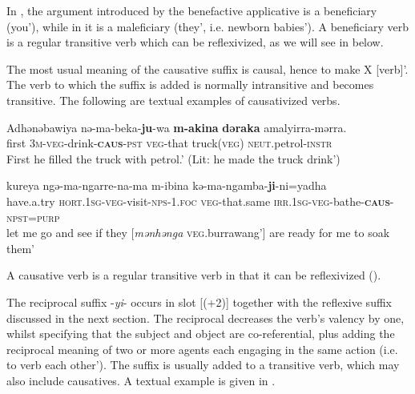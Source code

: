 \documentclass[output=paper]{langscibook}
\begin{document}
In , the argument introduced by the benefactive applicative is a beneficiary (you’), while in  it is a maleficiary (they’, i.e. newborn babies’). A beneficiary verb is a regular transitive verb which can be reflexivized, as we will see in  below.



\label{sec:vanegmond:2.3.3.2}


The most usual meaning of the causative suffix is causal, hence to make X [verb]’. The verb to which the suffix is added is normally intransitive and becomes transitive. The following are textual examples of causativized verbs.



\ea%
 \label{ex:vanegmond:14}

 \ea
 \label{ex:vanegmond:14a}
\gll Adhənəbawiya nə-ma-beka-\textbf{{ju}}{-wa} \textbf{m-akina} \textbf{dəraka} {amalyirra-mərra}.\\
first \textsc{3m}-\textsc{veg}-drink-\textbf{\textsc{caus}}-\textsc{pst} \textsc{veg}-that truck(\textsc{veg}) \textsc{neut}.petrol-\textsc{instr}\\
\glt First he filled the truck with petrol.’ (Lit: he made the truck drink’)

 \ex
 \label{ex:vanegmond:14b}
\gll kureya ngə-ma-ngarre-na-ma m-ibina kə-ma-ngamba-\textbf{ji}{-ni=yadha} \\
have.a.try \textsc{hort.1sg-veg}-visit-\textsc{nps}-1.\textsc{foc} \textsc{veg}-that.same \textsc{irr}.1\textsc{sg}-\textsc{veg}-bathe-\textbf{\textsc{caus}}-\textsc{npst}=\textsc{purp}\\
\glt let me go and see if they [\textit{mənhənga} \textsc{veg}.burrawang’] are ready for me to soak them’
\z
\z

A causative verb is a regular transitive verb in that it can be reflexivized ().


\label{sec:vanegmond:2.3.3.3}

The reciprocal suffix -\textit{yi}- occurs in slot [(+2)] together with the reflexive suffix discussed in the next section. The reciprocal decreases the verb’s valency by one, whilst specifying that the subject and object are co-referential, plus adding the reciprocal meaning of two or more agents each engaging in the same action (i.e. to verb each other’). The suffix is usually added to a transitive verb, which may also include causatives. A textual example is given in .
\end{document}
